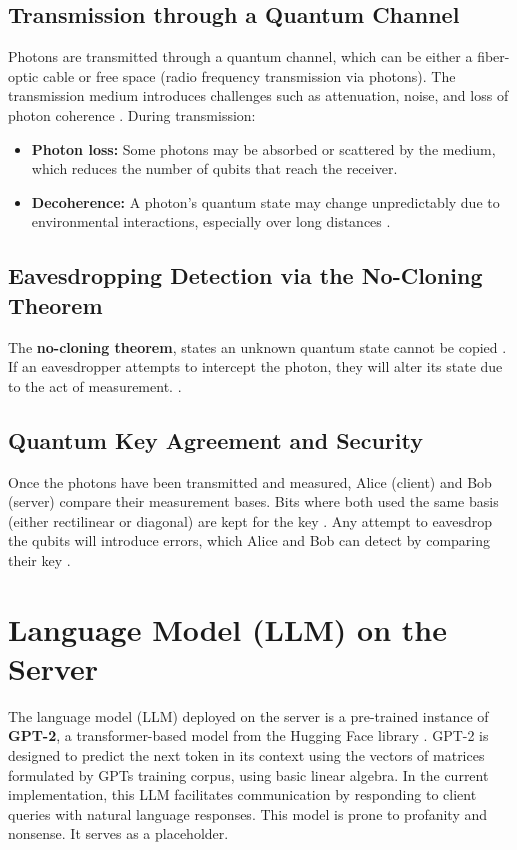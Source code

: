 \documentclass{article}
\begin{document}
\subsection{Transmission through a Quantum Channel}
Photons are transmitted through a quantum channel, which can be either a fiber-optic cable or free space (radio frequency transmission via photons). The transmission medium introduces challenges such as attenuation, noise, and loss of photon coherence \cite{patel2020}. During transmission:
\begin{itemize}
    \item \textbf{Photon loss:} Some photons may be absorbed or scattered by the medium, which reduces the number of qubits that reach the receiver\cite{aktas2016}.
    \item \textbf{Decoherence:} A photon's quantum state may change unpredictably due to environmental interactions, especially over long distances \cite{nielsen2010}.
\end{itemize}

\subsection{Eavesdropping Detection via the No-Cloning Theorem}
The \textbf{no-cloning theorem}, states an unknown quantum state cannot be copied \cite{lo2012}. If an eavesdropper attempts to intercept the photon, they will alter its state due to the act of measurement. \cite{bennett1984}.

\subsection{Quantum Key Agreement and Security}
Once the photons have been transmitted and measured, Alice (client) and Bob (server) compare their measurement bases. Bits where both used the same basis (either rectilinear or diagonal) are kept for the key \cite{bennett1984}. Any attempt to eavesdrop the qubits will introduce errors, which Alice and Bob can detect by comparing their key \cite{lo2012}.

\section{Language Model (LLM) on the Server}

The language model (LLM) deployed on the server is a pre-trained instance of \textbf{GPT-2}, a transformer-based model from the Hugging Face library \cite{huggingface_gpt2_2024}. GPT-2 is designed to predict the next token in its context using the vectors of matrices formulated by GPTs training corpus, using basic linear algebra.  In the current implementation, this LLM facilitates communication by responding to client queries with natural language responses. This model is prone to profanity and nonsense. It serves as a placeholder.
\end{document}
